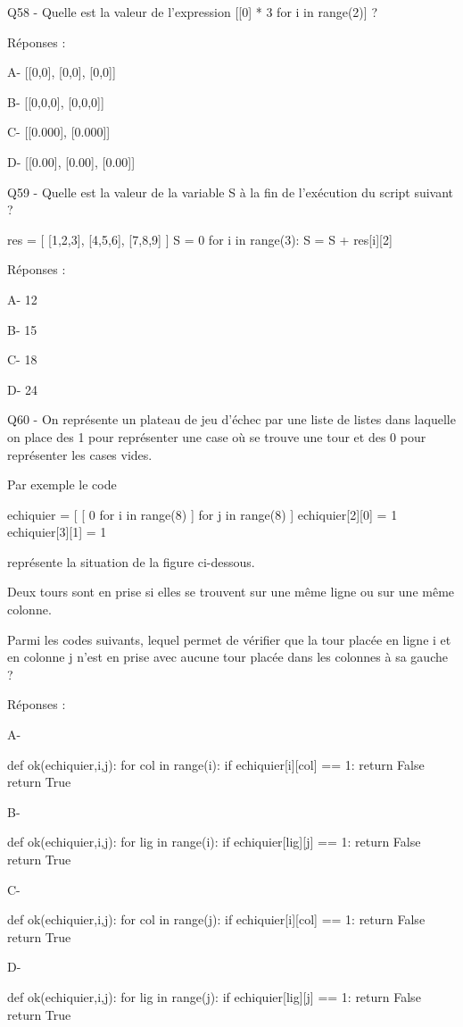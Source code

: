 \documentclass[
]{book}
\begin{document}
Q58 - Quelle est la valeur de l'expression {[}{[}0{]} * 3 for i in range(2){]} ?

Réponses :

A- {[}{[}0,0{]}, {[}0,0{]}, {[}0,0{]}{]}

B- {[}{[}0,0,0{]}, {[}0,0,0{]}{]}

C- {[}{[}0.000{]}, {[}0.000{]}{]}

D- {[}{[}0.00{]}, {[}0.00{]}, {[}0.00{]}{]}

Q59 - Quelle est la valeur de la variable S à la fin de l'exécution du script suivant ?

res = {[} {[}1,2,3{]}, {[}4,5,6{]}, {[}7,8,9{]} {]}
S = 0
for i in range(3):
S = S + res{[}i{]}{[}2{]}

Réponses :

A- 12

B- 15

C- 18

D- 24

Q60 - On représente un plateau de jeu d'échec par une liste de listes dans laquelle on place des 1 pour représenter une case où se trouve une tour et des 0 pour représenter les cases vides.

Par exemple le code

echiquier = {[} {[} 0 for i in range(8) {]} for j in range(8) {]}
echiquier{[}2{]}{[}0{]} = 1
echiquier{[}3{]}{[}1{]} = 1

représente la situation de la figure ci-dessous.

Deux tours sont en prise si elles se trouvent sur une même ligne ou sur une même colonne.

Parmi les codes suivants, lequel permet de vérifier que la tour placée en ligne i et en colonne j n'est en prise avec aucune tour placée dans les colonnes à sa gauche ?

Réponses :

A-

def ok(echiquier,i,j):
for col in range(i):
if echiquier{[}i{]}{[}col{]} == 1:
return False
return True

B-

def ok(echiquier,i,j):
for lig in range(i):
if echiquier{[}lig{]}{[}j{]} == 1:
return False
return True

C-

def ok(echiquier,i,j):
for col in range(j):
if echiquier{[}i{]}{[}col{]} == 1:
return False
return True

D-

def ok(echiquier,i,j):
for lig in range(j):
if echiquier{[}lig{]}{[}j{]} == 1:
return False
return True
\end{document}
